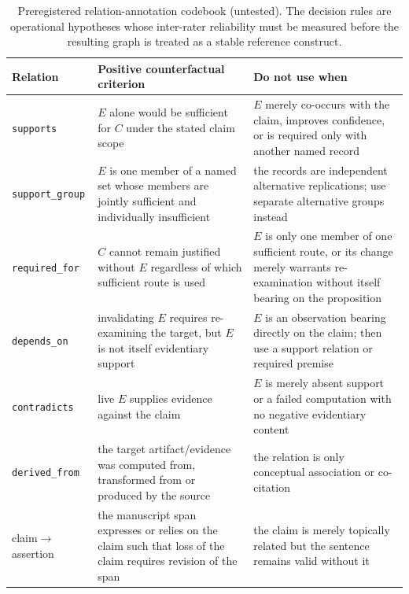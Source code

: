 \documentclass[journal]{IEEEtran}
\begin{document}
\begin{table}[!t]
\centering
\caption{Preregistered relation-annotation codebook (untested). The decision rules are operational hypotheses whose inter-rater reliability must be measured before the resulting graph is treated as a stable reference construct.}
\label{tab:annotation_codebook}
\scriptsize
\begin{tabularx}{\textwidth}{p{2.5cm}>{\raggedright\arraybackslash}X>{\raggedright\arraybackslash}X}
\toprule
Relation & Positive counterfactual criterion & Do not use when \\
\midrule
\texttt{supports} & $E$ alone would be sufficient for $C$ under the stated claim scope & $E$ merely co-occurs with the claim, improves confidence, or is required only with another named record \\
\texttt{support\_group} & $E$ is one member of a named set whose members are jointly sufficient and individually insufficient & the records are independent alternative replications; use separate alternative groups instead \\
\texttt{required\_for} & $C$ cannot remain justified without $E$ regardless of which sufficient route is used & $E$ is only one member of one sufficient route, or its change merely warrants re-examination without itself bearing on the proposition \\
\texttt{depends\_on} & invalidating $E$ requires re-examining the target, but $E$ is not itself evidentiary support & $E$ is an observation bearing directly on the claim; then use a support relation or required premise \\
\texttt{contradicts} & live $E$ supplies evidence against the claim & $E$ is merely absent support or a failed computation with no negative evidentiary content \\
\texttt{derived\_from} & the target artifact/evidence was computed from, transformed from or produced by the source & the relation is only conceptual association or co-citation \\
claim$\to$assertion & the manuscript span expresses or relies on the claim such that loss of the claim requires revision of the span & the claim is merely topically related but the sentence remains valid without it \\
\bottomrule
\end{tabularx}
\end{table}
\end{document}
